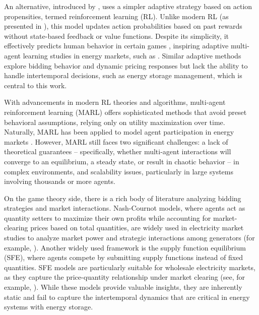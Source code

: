\documentclass{article}
\theoremstyle{definition}
\theoremstyle{plain}
\begin{document}
An alternative, introduced by \cite{Roth1}, uses a simpler adaptive strategy based on action propensities, termed reinforcement learning (RL). Unlike modern RL (as presented in \cite{RLBook}), this model updates action probabilities based on past rewards without state-based feedback or value functions. Despite its simplicity, it effectively predicts human behavior in certain games \citep{Roth2}, inspiring adaptive multi-agent learning studies in energy markets, such as \cite{Bunn, Tesfatsion}. Similar adaptive methods \cite{Ilic, Rogers} explore bidding behavior and dynamic pricing responses but lack the ability to handle intertemporal decisions, such as energy storage management, which is central to this work.

With advancements in modern RL theories and algorithms, multi-agent reinforcement learning (MARL) offers sophisticated methods that avoid preset behavioral assumptions, relying only on utility maximization over time. Naturally, MARL has been applied to model agent participation in energy markets \cite{XueMARL, GoranMARL}. However, MARL still faces two significant challenges: a lack of theoretical guarantees -- specifically, whether multi-agent interactions will converge to an equilibrium, a steady state, or result in chaotic behavior -- in complex environments, and scalability issues, particularly in large systems involving thousands or more agents.

On the game theory side, there is a rich body of literature analyzing bidding strategies and market interactions. Nash-Cournot models, where agents act as quantity setters to maximize their own profits while accounting for market-clearing prices based on total quantities, are widely used in electricity market studies to analyze market power and strategic interactions among generators (for example, \cite{hobbs1986network,willems2002modeling,neuhoff2005network,metzler2003nash}). Another widely used framework is the supply function equilibrium (SFE), where agents compete by submitting supply functions instead of fixed quantities. SFE models are particularly suitable for wholesale electricity markets, as they capture the price-quantity relationship under market clearing (see, for example, \cite{baldick2004theory,rudkevich2005supply,anderson2002using,anderson2005supply,holmberg2010supply}). While these models provide valuable insights, they are inherently static and fail to capture the intertemporal dynamics that are critical in energy systems with energy storage.
\end{document}
